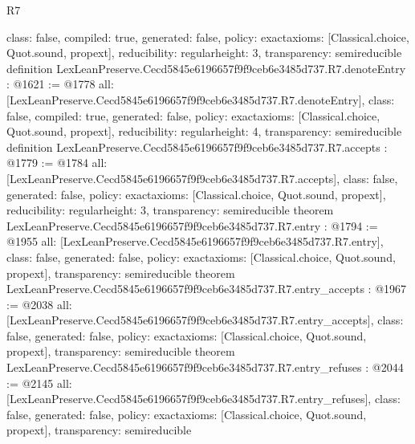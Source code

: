 \begin{lexlean}{R7}
\begin{coremodule}
{  class: false,
  compiled: true,
  generated: false,
  policy: exact{axioms: [Classical.choice, Quot.sound, propext]},
  reducibility: regular{height: 3},
  transparency: semireducible
}
definition LexLeanPreserve.Cecd5845e6196657f9f9ceb6e3485d737.R7.denoteEntry : @1621 := @1778 {
  all: [LexLeanPreserve.Cecd5845e6196657f9f9ceb6e3485d737.R7.denoteEntry],
  class: false,
  compiled: true,
  generated: false,
  policy: exact{axioms: [Classical.choice, Quot.sound, propext]},
  reducibility: regular{height: 4},
  transparency: semireducible
}
definition LexLeanPreserve.Cecd5845e6196657f9f9ceb6e3485d737.R7.accepts : @1779 := @1784 {
  all: [LexLeanPreserve.Cecd5845e6196657f9f9ceb6e3485d737.R7.accepts],
  class: false,
  generated: false,
  policy: exact{axioms: [Classical.choice, Quot.sound, propext]},
  reducibility: regular{height: 3},
  transparency: semireducible
}
theorem LexLeanPreserve.Cecd5845e6196657f9f9ceb6e3485d737.R7.entry : @1794 := @1955 {
  all: [LexLeanPreserve.Cecd5845e6196657f9f9ceb6e3485d737.R7.entry],
  class: false,
  generated: false,
  policy: exact{axioms: [Classical.choice, Quot.sound, propext]},
  transparency: semireducible
}
theorem LexLeanPreserve.Cecd5845e6196657f9f9ceb6e3485d737.R7.entry_accepts : @1967 := @2038 {
  all: [LexLeanPreserve.Cecd5845e6196657f9f9ceb6e3485d737.R7.entry_accepts],
  class: false,
  generated: false,
  policy: exact{axioms: [Classical.choice, Quot.sound, propext]},
  transparency: semireducible
}
theorem LexLeanPreserve.Cecd5845e6196657f9f9ceb6e3485d737.R7.entry_refuses : @2044 := @2145 {
  all: [LexLeanPreserve.Cecd5845e6196657f9f9ceb6e3485d737.R7.entry_refuses],
  class: false,
  generated: false,
  policy: exact{axioms: [Classical.choice, Quot.sound, propext]},
  transparency: semireducible
}


\end{coremodule}
\end{lexlean}
